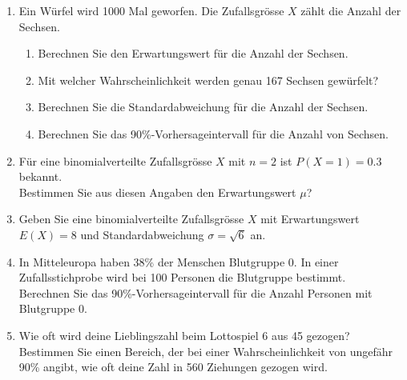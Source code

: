 \clearpage
\begin{ueb}
    {}{}
    \begin{enumerate}
        \item Ein Würfel wird 1000 Mal geworfen. Die Zufallsgrösse \( X \) zählt die Anzahl der Sechsen.
              \begin{enumerate}
                  \item Berechnen Sie den Erwartungswert für die Anzahl der Sechsen.
                  \item Mit welcher Wahrscheinlichkeit werden genau 167 Sechsen gewürfelt?
                  \item Berechnen Sie die Standardabweichung für die Anzahl der Sechsen.
                  \item Berechnen Sie das 90\%-Vorhersageintervall für die Anzahl von Sechsen.
              \end{enumerate}

        \item Für eine binomialverteilte Zufallsgrösse \( X \) mit \( n = 2 \) ist \( P(X = 1) =  0.3 \) bekannt. \\
              Bestimmen Sie aus diesen Angaben den Erwartungswert \(\mu\)?

        \item Geben Sie eine binomialverteilte Zufallsgrösse \( X \) mit Erwartungswert \( E(X) = 8 \) und Standardabweichung \( \sigma = \sqrt{6} \) an.

        \item In Mitteleuropa haben 38\% der Menschen Blutgruppe 0.
              In einer Zufallsstichprobe wird bei 100 Personen die Blutgruppe bestimmt. \\
              Berechnen Sie das 90\%-Vorhersageintervall für die Anzahl Personen mit Blutgruppe 0.

        \item Wie oft wird deine Lieblingszahl beim Lottospiel 6 aus 45 gezogen? \\
              Bestimmen Sie einen Bereich, der bei einer Wahrscheinlichkeit von ungefähr 90\% angibt, wie oft deine Zahl in 560 Ziehungen gezogen wird.


\end{enumerate}
\end{ueb}
